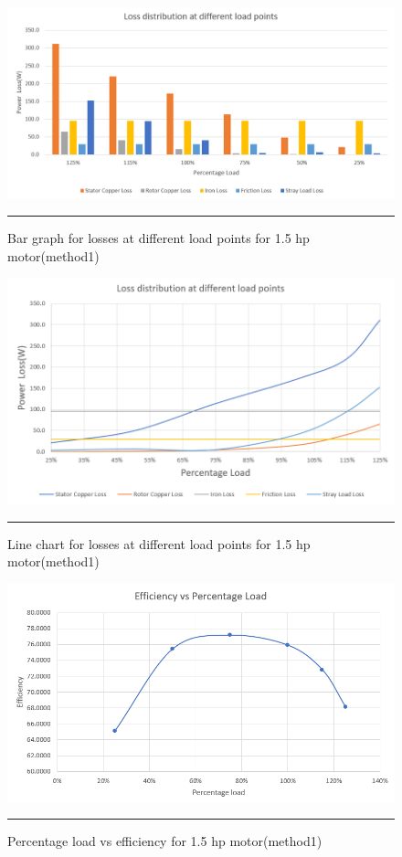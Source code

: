 \begin{figure}[htbp]
	\centering
		\includegraphics[width = 4.5in]{./Figures/MS/fig515.png}
		\rule{35em}{0.5pt}
	\caption{Bar graph for losses at different load points for 1.5 hp motor(method1)}
	\label{fig:Bar graph for losses at different load points for 1.5 hp motor(method1)} 
\end{figure}
\begin{figure}[htbp]
	\centering
		\includegraphics[width = 4.5in]{./Figures/MS/fig516.png}
		\rule{35em}{0.5pt}
	\caption{Line chart for losses at different load points for 1.5 hp motor(method1)}
	\label{fig:Line chart for losses at different load points for 1.5 hp motor(method1)} 
\end{figure}
\begin{figure}[htbp]
	\centering
		\includegraphics[width = 4.5in]{./Figures/MS/fig517.png}
		\rule{35em}{0.5pt}
	\caption{Percentage load vs efficiency for 1.5 hp motor(method1)}
	\label{fig:Percentage load vs efficiency for 1.5 hp motor(method1)} 
\end{figure}
